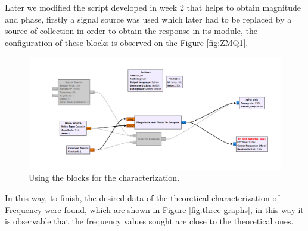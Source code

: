 \documentclass[12pt, twoside]{report}
\begin{document}
Later we modified the script developed in week 2 that helps to obtain magnitude and phase, firstly a signal source was used which later had to be replaced by a source of collection in order to obtain the response in its module, the configuration of these blocks is observed on the Figure \ref{fig:ZMQ1}.
\begin{figure}[!h]
\centering
  \includegraphics[width=\linewidth]{images/noise_3.png}
  \caption{Using the blocks for the characterization.}
  \label{fig:ZMQ1q}
\end{figure}
In this way, to finish, the desired data of the theoretical characterization of Frequency were found, which are shown in Figure \ref{fig:three graphs}, in this way it is observable that the frequency values sought are close to the theoretical ones.
\end{document}
